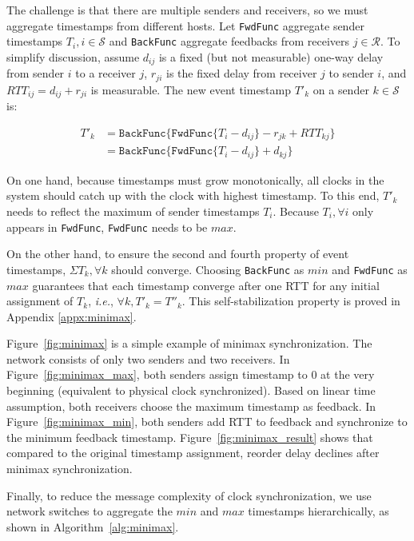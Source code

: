 The challenge is that there are multiple senders and receivers, so we must aggregate timestamps from different hosts.
Let \texttt{FwdFunc} aggregate sender timestamps $T_i, i \in \mathcal{S}$ and \texttt{BackFunc} aggregate feedbacks from receivers $j \in \mathcal{R}$.
To simplify discussion, assume $d_{ij}$ is a fixed (but not measurable) one-way delay from sender $i$ to a receiver $j$, $r_{ji}$ is the fixed delay from receiver $j$ to sender $i$, and $RTT_{ij} = d_{ij} + r_{ji}$ is measurable.
The new event timestamp $T'_k$ on a sender $k \in \mathcal{S}$ is:

\begin{equation*}
\begin{aligned}
T'_k & = \texttt{BackFunc} \{ \texttt{FwdFunc} \{ T_i - d_{ij} \} - r_{jk} + RTT_{kj} \} \\
     & = \texttt{BackFunc} \{ \texttt{FwdFunc} \{ T_i - d_{ij} \} + d_{kj} \}
\end{aligned}
\end{equation*}

On one hand, because timestamps must grow monotonically, all clocks in the system should catch up with the clock with highest timestamp.
To this end, $T'_k$ needs to reflect the maximum of sender timestamps $T_i$.
Because $T_i, \forall i$ only appears in \texttt{FwdFunc}, \texttt{FwdFunc} needs to be $max$.

On the other hand, to ensure the second and fourth property of event timestamps, $\Sigma T_k, \forall k$ should converge.
Choosing \texttt{BackFunc} as $min$ and \texttt{FwdFunc} as $max$ guarantees that each timestamp converge after one RTT for any initial assignment of $T_k$, \textit{i.e.}, $\forall k, T'_k = T''_k$.
This self-stabilization property is proved in Appendix \ref{appx:minimax}.

Figure~\ref{fig:minimax} is a simple example of minimax synchronization.
The network consists of only two senders and two receivers.
In Figure~\ref{fig:minimax_max}, both senders assign timestamp to $0$ at the very beginning (equivalent to physical clock synchronized).
Based on linear time assumption, both receivers choose the maximum timestamp as feedback.
In Figure~\ref{fig:minimax_min}, both senders add RTT to feedback and synchronize to the minimum feedback timestamp.
Figure~\ref{fig:minimax_result} shows that compared to the original timestamp assignment, reorder delay declines after minimax synchronization.

Finally, to reduce the message complexity of clock synchronization, we use network switches to aggregate the $min$ and $max$ timestamps hierarchically, as shown in Algorithm~\ref{alg:minimax}.
\fi

